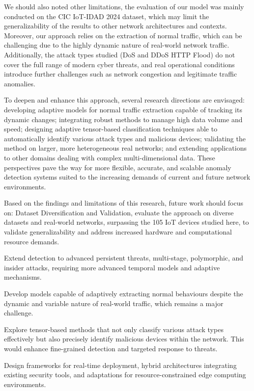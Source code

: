 \documentclass{ieeeaccess}
\begin{document}
We should also noted other limitations, the evaluation of our model was mainly conducted on the CIC IoT-IDAD 2024 dataset, which may limit the generalizability of the results to other network architectures and contexts. Moreover, our approach relies on the extraction of normal traffic, which can be challenging due to the highly dynamic nature of real-world network traffic. Additionally, the attack types studied (DoS and DDoS HTTP Flood) do not cover the full range of modern cyber threats, and real operational conditions introduce further challenges such as network congestion and legitimate traffic anomalies.

To deepen and enhance this approach, several research directions are envisaged: developing adaptive models for normal traffic extraction capable of tracking its dynamic changes; integrating robust methods to manage high data volume and speed; designing adaptive tensor-based classification techniques able to automatically identify various attack types and malicious devices; validating the method on larger, more heterogeneous real networks; and extending applications to other domains dealing with complex multi-dimensional data. These perspectives pave the way for more flexible, accurate, and scalable anomaly detection systems suited to the increasing demands of current and future network environments.

Based on the findings and limitations of this research, future work should focus on: Dataset Diversification and Validation, evaluate the approach on diverse datasets and real-world networks, surpassing the 105 IoT devices studied here, to validate generalizability and address increased hardware and computational resource demands.

\noindent Extend detection to advanced persistent threats, multi-stage, polymorphic, and insider attacks, requiring more advanced temporal models and adaptive mechanisms.
   
\noindent Develop models capable of adaptively extracting normal behaviours despite the dynamic and variable nature of real-world traffic, which remains a major challenge.
    

\noindent Explore tensor-based methods that not only classify various attack types effectively but also precisely identify malicious devices within the network. This would enhance fine-grained detection and targeted response to threats.
    
\noindent Design frameworks for real-time deployment, hybrid architectures integrating existing security tools, and adaptations for resource-constrained edge computing environments.
    
\end{document}
